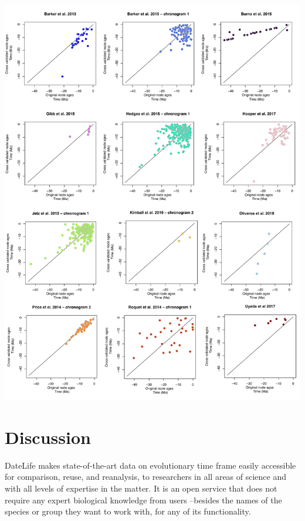 \documentclass[english,man]{apa6}
\begin{document}
\begin{minipage}{18cm}
\begin{center}
\includegraphics{../figures/fringillidae-cross-validation/fig-cross-validation-xy-plots.pdf}
\end{center}
\label{fig:cvXY}
\end{minipage}

\hypertarget{discussion}{%
\section{Discussion}\label{discussion}}

DateLife makes state-of-the-art data on evolutionary time frame easily accessible for comparison, reuse, and reanalysis, to researchers in all areas of science and with all levels of expertise in the matter. It is an open service that does not require any expert biological knowledge from users --besides the names of the species or group they want to work with, for any of its functionality.
\end{document}
